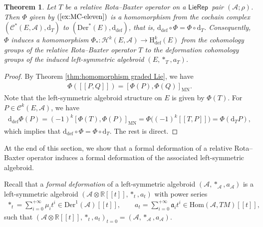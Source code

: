 \documentclass[pdftex]{sigma}%
\numberwithin{equation}{section}
\newtheorem{thm}{Theorem}[section]
\newcommand{\Real}{\mathbb R}
\newcommand{\huaA}{\mathcal{A}}
\newcommand{\huaC}{\mathcal{C}}
\newcommand{\huaH}{\mathcal{H}}
\newcommand{\frka}{\mathfrak a}
\newcommand{\Courant}[1]{\left[\!\left[ #1\right]\!\right]}
\newcommand{\dM}{\mathrm{d}}
\newcommand{\Hom}{\mathrm{Hom}}
\newcommand{\Der}{\mathrm{Der}}
\newcommand{\Hi}{\mathrm{H}}
\newcommand{\MN}{\mathrm{MN}}
\newcommand{\Def}{\mathrm{def}}
\newcommand{\LP}{$\mathsf{LieRep}$~}
\begin{document}
\begin{thm}%
Let $T$ be a relative Rota--Baxter operator on a \LP pair $(\huaA;\rho)$. Then $\Phi$ given by $(\ref{ex:MC-eleven})$ is a homomorphism from the cochain complex $(\huaC^*(E,\huaA),\dM_{T})$ to $(\Der^*(E),\dM_{\Def})$, that is, $\dM_{\Def}\circ\Phi=\Phi\circ \dM_{T}$. Consequently, $\Phi$ induces a homomorphism $\Phi_{*}\colon \huaH^k(E,\huaA)\rightarrow \Hi_{\Def}^{k}(E)$ from the cohomology groups of the relative Rota--Baxter operator $T$ to the deformation cohomology groups of the induced left-symmetric algebroid $(E, \ast_{T}, a_T)$.
\end{thm}

\begin{proof}
By Theorem \ref{thm:homomorphism graded Lie}, we have
\begin{gather*}
\Phi(\Courant{P,Q})=[\Phi(P),\Phi(Q)]_\MN.
\end{gather*}
Note that the left-symmetric algebroid structure on $E$ is given by $\Phi(T)$. For $P\in\huaC^{k}(E,\huaA)$, we have
\begin{eqnarray*}
 \dM_{\Def}\Phi(P)=(-1)^k[\Phi(T),\Phi(P)]_{\MN}=\Phi\big((-1)^k\Courant{T,P}\big)=\Phi(\dM_T P),
\end{eqnarray*}
which implies that $\dM_{\Def}\circ\Phi=\Phi\circ \dM_{T}$. The rest is direct.
\end{proof}

At the end of this section, we show that a formal deformation of a relative Rota--Baxter operator induces a formal deformation of the associated left-symmetric algebroid.

Recall that a {\it formal deformation} of a left-symmetric algebroid $(\huaA,\ast_{\huaA},a_{\huaA})$ is a left-symmetric algebroid $(\huaA\otimes \Real[[t]],\ast_t,a_t)$ with power series
\begin{gather*}
 \ast_t =\sum_{i=0}^{+\infty}\mu_it^i\in \Der^1(\huaA)[[t]],\qquad
 a_t=\sum_{i=0}^{+\infty}\frka_i t^i \in \Hom(\huaA,TM)[[t]],
\end{gather*}
such that $(\huaA\otimes \Real[[t]],\ast_t,a_t)_{t=0}=(\huaA,\ast_{\huaA},a_{\huaA})$.
\end{document}

